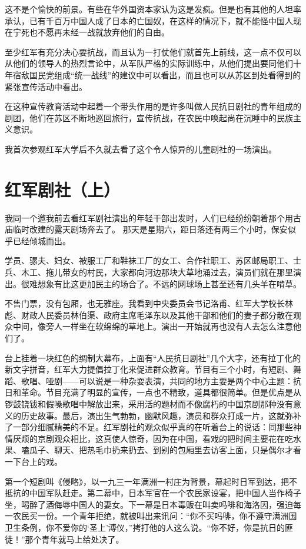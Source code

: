 \documentclass[10pt]{book}
\begin{document}
这不是个愉快的前景。有些在华外国资本家认为这是发疯。但是也有其他的人坦率承认，已有千百万中国人成了日本的亡国奴，在这样的情况下，就不能怪中国人现在宁死也不愿再未经一战就放弃他们的自由。

至少红军有充分决心要抗战，而且认为一打仗他们就首先上前线，这一点不仅可以从他们的领导人的热烈言论中，从军队严格的实际训练中，从他们提出要同他们十年宿敌国民党组成“统一战线”的建议中可以看出，而且也可以从苏区到处看得到的紧张宣传活动中看出。

在这种宣传教育活动中起着一个带头作用的是许多叫做人民抗日剧社的青年组成的剧团，他们在苏区不断地巡回旅行，宣传抗战，在农民中唤起尚在沉睡中的民族主义意识。

我首次参观红军大学后不久就去看了这个令人惊异的儿童剧社的一场演出。



\section{红军剧社（上）}

我同一个邀我前去看红军剧社演出的年轻干部出发时，人们已经纷纷朝着那个用古庙临时改建的露天剧场奔去了。 那天是星期六，距日落还有两三个小时，保安似乎已经倾城而出。

学员、骡夫、妇女、被服工厂和鞋袜工厂的女工、合作社职工、苏区邮局职工、士兵、木工、拖儿带女的村民，大家都向河边那块大草地涌过去，演员们就在那里演出。很难想象有比这更加民主的场合了。不远的网球场上甚至还有几头羊在啃草。

不售门票，没有包厢，也无雅座。我看到中央委员会书记洛甫、红军大学校长林彪、财政人民委员林伯渠、政府主席毛泽东以及其他干部和他们的妻子都分散在观众中间，像旁人一样坐在软绵绵的草地上。演出一开始就再也没有人去怎么注意他们了。

台上挂着一块红色的绸制大幕布，上面有“人民抗日剧社”几个大字，还有拉丁化的新文字拼音，红军大力提倡拉丁化来促进群众教育。节目有三个小时，有短剧、舞蹈、歌唱、哑剧——可以说是一种杂耍表演，共同的地方主要是两个中心主题：抗日和革命。节目充满了明显的宣传，一点也不精致，道具都很简单。但是优点是从锣鼓铙钹和假嗓歌唱中解放出来，采用活的题材而不像腐朽的中国京剧那种没有意义的历史故事。最后，演出生气勃勃，幽默风趣，演员和群众打成一片，这就弥补了一部分细腻精美的不足。红军剧社的观众似乎真的在听着台上的说话：同那些神情厌烦的京剧观众相比，这真使人惊奇，因为在中国，看戏的把时间主要花在吃水果、嗑瓜子、聊天、把热毛巾扔来扔去、到别的包厢里去访客上面，只是偶尔才看一下台上的戏。

第一个短剧叫《侵略》，以一九三一年满洲一村庄为背景，幕起时日军到达，把不抵抗的中国军队赶走。第二幕中，日本军官在一个农民家设宴，把中国人当作椅子坐，喝醉了酒侮辱中国人的妻女。下一幕是日本毒贩在叫卖吗啡和海洛因，强迫每一农民买一份。一个青年拒绝，就被叫出来讯问：“你不买吗啡，你不遵守满洲国卫生条例，你不爱你的‘圣上’溥仪，”拷打他的人这么说。“你不好，你是抗日的匪徒！”那个青年就马上给处决了。
\end{document}
